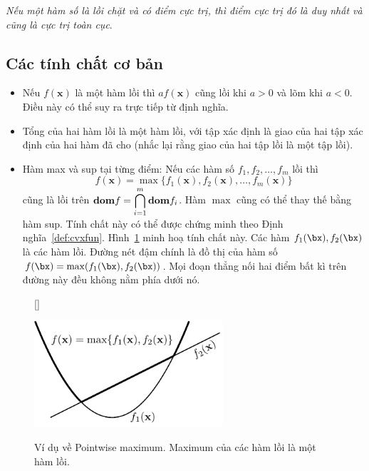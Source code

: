 \textit{Nếu một hàm số là \textit{lồi chặt} và có điểm cực trị, thì điểm cực trị đó là duy nhất và cũng là cực trị toàn cục}. 
 
 
\subsection{Các tính chất cơ bản}
\label{ssub:16_properties}
\begin{itemize}
    \item Nếu $f(\mathbf{x})$ là một hàm lồi thì $af(\mathbf{x})$ cũng lồi khi $a > 0$ và lõm khi $a < 0$. Điều này có
    thể suy ra trực tiếp từ định nghĩa.
     
    \item Tổng của hai {hàm lồi} là một {hàm lồi}, với tập xác
    định là giao của hai tập xác định của hai hàm đã cho (nhắc lại rằng giao của
    hai tập lồi là một tập lồi).
    \item {Hàm max và sup tại từng điểm}: Nếu các hàm số $f_1, f_2,
    \dots, f_m$ lồi thì
    \begin{equation*} 
    f(\mathbf{x}) = \max\{f_1(\mathbf{x}), f_2(\mathbf{x}), \dots, f_m(\mathbf{x})\} 
    \end{equation*} 
    cũng là lồi trên $\displaystyle \boldsymbol{\mathbf{dom}} f = \bigcap_{i=1}^m \boldsymbol{\mathbf{dom}} f_i$. Hàm $\max$ cũng có thể thay thế bằng hàm
    {sup}. Tính chất này có thể được chứng minh theo
    Định nghĩa~\ref{def:cvxfun}. Hình~\ref{fig:16_max_point} minh hoạ tính chất
    này. Các hàm $f_1(\bx), f_2(\bx)$ là các hàm lồi. Đường nét đậm chính là đồ
    thị của hàm số $f(\bx) = \max(f_1(\bx), f_2(\bx))$. Mọi đoạn thẳng nối hai
    điểm bất kì trên đường này đều {không nằm phía dưới} nó.
 
\end{itemize}

\begin{figure}[t]
    [\FBwidth]
    {\caption{Ví dụ về Pointwise maximum. Maximum của các hàm lồi là một hàm lồi.}
    \label{fig:16_max_point}}
    {\includegraphics[width=7cm]{Chapters/08_ConvexOptimization/16_convexity/latex/max_point.pdf}}
\end{figure}


